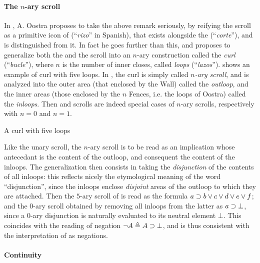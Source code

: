 \paragraph{The $n$-ary scroll}

In \cite{oostra_graficos_2010}, A. Oostra proposes to take the above remark
seriously, by reifying the scroll as a primitive icon of  (``\emph{rizo}'' in
Spanish), that exists alongside the  (``\emph{corte}''), and is distinguished
from it. In fact he goes further than this, and proposes to generalize both the
 and the scroll into an $n$-ary construction called the \emph{curl}
(``\emph{bucle}''), where $n$ is the number of inner closes, called \emph{loops}
(``\emph{lazos}'').  shows an example of curl with five
loops. In \cite{minghui_graphical_2019}, the curl is simply called \emph{$n$-ary
scroll}, and is analyzed into the outer area (that enclosed by the Wall) called
the \emph{outloop}, and the inner areas (those enclosed by the $n$ Fences, i.e.
the loops of Oostra) called the \emph{inloops}. Then  and scrolls are indeed
special cases of $n$-ary scrolls, respectively with $n = 0$ and $n = 1$.

\begin{marginfigure}
  \caption{A curl with five loops}
\end{marginfigure}

Like the unary scroll, the $n$-ary scroll is to be read as an implication whose
antecedant is the content of the outloop, and consequent the content of the
inloops. The generalization then consists in taking the \emph{disjunction} of
the contents of all inloops: this reflects nicely the etymological meaning of
the word ``disjunction'', since the inloops enclose \emph{disjoint} areas of the
outloop to which they are attached. Then the $5$-ary scroll of
 is read as the formula $a \supset b \lor c \lor d \lor e \lor
f$; and the $0$-ary scroll obtained by removing all inloops from the latter as
$a \supset \bot$, since a $0$-ary disjunction is naturally evaluated to its
neutral element $\bot$. This coincides with the  reading of
negation $\neg A \triangleq A \supset \bot$, and is thus consistent with the
interpretation of  as negations.

\paragraph{Continuity}

